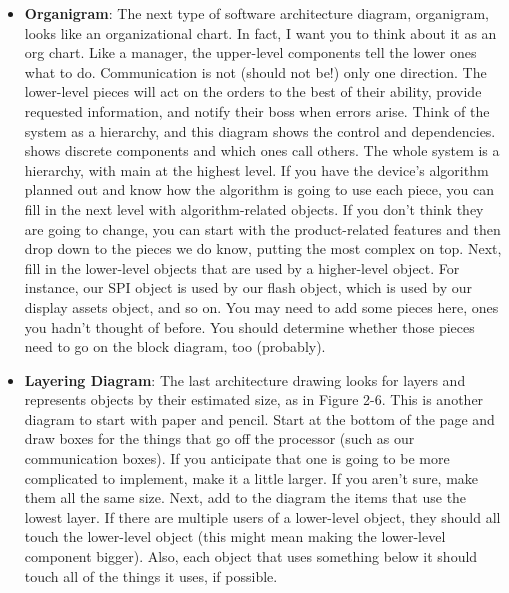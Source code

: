 \documentclass{report}
\begin{document}
\begin{itemize}
            \bigbreak \noindent 
            Add any other software structures you can think of: databases, buffering systems, command handlers, algorithms, state machines, etc.
            \bigbreak \noindent 
            Try to represent everything from the hardware to the product function in the diagram
        \item \textbf{Organigram}: The next type of software architecture diagram, organigram, looks like an organizational chart. In fact, I want you to think about it as an org chart. Like a manager, the upper-level components tell the lower ones what to do. Communication is not (should not be!) only one direction. The lower-level pieces will act on the orders to the best of their ability, provide requested information, and notify their boss when errors arise. Think of the system as a hierarchy, and this diagram shows the control and dependencies.
            \bigbreak \noindent 
            shows discrete components and which ones call others. The whole system is a hierarchy, with main at the highest level. If you have the device’s algorithm planned out and know how the algorithm is going to use each piece, you can fill in the next level with algorithm-related objects. If you don’t think they are going to change, you can start with the product-related features and then drop down to the pieces we do know, putting the most complex on top. Next, fill in the lower-level objects that are used by a higher-level object. For instance, our SPI object is used by our flash object, which is used by our display assets object, and so on. You may need to add some pieces here, ones you hadn’t thought of before. You should determine whether those pieces need to go on the block diagram, too (probably).
            \bigbreak \noindent 
        \item \textbf{Layering Diagram}: The last architecture drawing looks for layers and represents objects by their estimated size, as in Figure 2-6. This is another diagram to start with paper and pencil. Start at the bottom of the page and draw boxes for the things that go off the processor (such as our communication boxes). If you anticipate that one is going to be more complicated to implement, make it a little larger. If you aren’t sure, make them all the same size.
            \bigbreak \noindent 
            Next, add to the diagram the items that use the lowest layer. If there are multiple users of a lower-level object, they should all touch the lower-level object (this might mean making the lower-level component bigger). Also, each object that uses something below it should touch all of the things it uses, if possible.

\end{itemize}
\end{document}
